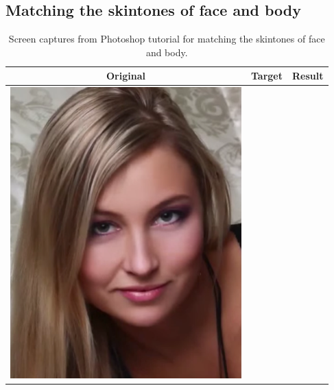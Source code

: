 \begin{longtable}{|c|c|}
\begin{minipage}{.29\textwidth}
  \end{minipage} \\
    \hline
\end{longtable}
\pagebreak

\subsection{Matching the skintones of face and body}\label{app:photoshop_match_body}
\begin{longtable}{|c|c|c|}
    \caption{Screen captures from Photoshop tutorial for matching the skintones of face and body.}\\
    \hline
    Original & Target & Result \\
    \hline
  \begin{minipage}{.29\textwidth}
    \includegraphics[width=\textwidth,height=\textheight,keepaspectratio]{images/match_body_orig}
  \end{minipage} & 
  \begin{minipage}{.29\textwidth}

\end{minipage}
\end{longtable}

